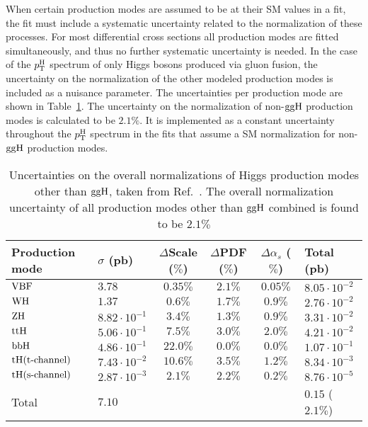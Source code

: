 
When certain production modes are assumed to be at their SM values in a fit, the fit must include a systematic uncertainty related to the normalization of these processes.
% 
For most differential cross sections all production modes are fitted simultaneously, and thus no further systematic uncertainty is needed.
% 
In the case of the $p_\mathrm{T}^\mathrm{H}$ spectrum of only Higgs bosons produced via gluon fusion, the uncertainty on the normalization of the other modeled production modes is included as a nuisance parameter.
% 
The uncertainties per production mode are shown in Table~\ref{tab:xhunc}.
% 
The uncertainty on the normalization of non-$\mathrm{g}\mathrm{g}\mathrm{H}$ production modes is calculated to be $2.1\%$.
% 
It is implemented as a constant uncertainty throughout the $p_\mathrm{T}^\mathrm{H}$ spectrum in the fits that assume a SM normalization for non-$\mathrm{g}\mathrm{g}\mathrm{H}$ production modes.


\begin{table}[h!]
\footnotesize
\caption{
    Uncertainties on the overall normalizations of Higgs production modes other than $\mathrm{g}\mathrm{g}\mathrm{H}$, taken from Ref.~\cite{deFlorian:2016spz}.
    The overall normalization uncertainty of all production modes other than $\mathrm{g}\mathrm{g}\mathrm{H}$ combined is found to be $2.1\%$
    }
\label{tab:xhunc}
\begin{center}
\begin{tabular}{llcccl}
Production mode  &  $\sigma$ (pb)  &  $\Delta$Scale ($\%$)  &  $\Delta$PDF ($\%$)  &  $\Delta\alpha_s$ ($\%$)  &  Total (pb) \\
\hline
$\text{VBF}$                               & $3.78$                & $0.35\%$     & $2.1\%$      & $0.05\%$            & $8.05 \cdot 10^{-2}$ \\
$\mathrm{W}\mathrm{H}$                     & $1.37$                & $0.6\%$      & $1.7\%$      & $0.9\%$             & $2.76 \cdot 10^{-2}$ \\
$\mathrm{Z}\mathrm{H}$                     & $8.82 \cdot 10^{-1}$  & $3.4\%$      & $1.3\%$      & $0.9\%$             & $3.31 \cdot 10^{-2}$ \\
$\mathrm{t}\mathrm{t}\mathrm{H}$                               & $5.06 \cdot 10^{-1}$  & $7.5\%$      & $3.0\%$      & $2.0\%$             & $4.21 \cdot 10^{-2}$ \\
$\mathrm{b}\mathrm{b}\mathrm{H}$                               & $4.86 \cdot 10^{-1}$  & $22.0\%$     & $0.0\%$      & $0.0\%$             & $1.07 \cdot 10^{-1}$ \\
$\mathrm{t}\mathrm{H} (\text{t-channel})$  & $7.43 \cdot 10^{-2}$  & $10.6\%$     & $3.5\%$      & $1.2\%$             & $8.34 \cdot 10^{-3}$ \\
$\mathrm{t}\mathrm{H} (\text{s-channel})$  & $2.87 \cdot 10^{-3}$  & $2.1\%$      & $2.2\%$      & $0.2\%$             & $8.76 \cdot 10^{-5}$ \\
\hline
Total                                & $7.10$                &              &              &                     & $0.15$ ($2.1\%$) \\
\end{tabular}
\end{center}
\end{table}


